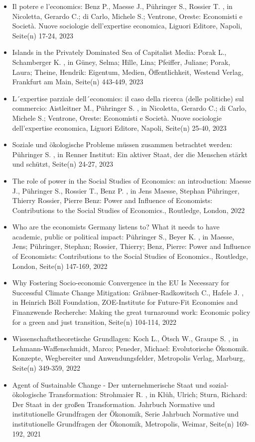 \begin{itemize}
\item Il potere e l'economics: Benz P., Maesse J., Pühringer S., Rossier T. , in Nicoletta, Gerardo C.; di Carlo, Michele S.; Ventrone, Oreste: Economisti e Società. Nuove sociologie dell'expertise economica, Liguori Editore, Napoli, Seite(n) 17-24, 2023
\item Islands in the Privately Dominated Sea of Capitalist Media: Porak L., Schamberger K. , in Güney, Selma; Hille, Lina; Pfeiffer, Juliane; Porak, Laura; Theine, Hendrik: Eigentum, Medien, Öffentlichkeit, Westend Verlag, Frankfurt am Main, Seite(n) 443-449, 2023
\item L´expertise parziale dell´economics: il caso della ricerca (delle politiche) sul commercio: Aistleitner M., Pühringer S. , in Nicoletta, Gerardo C.; di Carlo, Michele S.; Ventrone, Oreste: Economisti e Società. Nuove sociologie dell'expertise economica, Liguori Editore, Napoli, Seite(n) 25-40, 2023
\item Soziale und ökologische Probleme müssen zusammen betrachtet werden: Pühringer S. , in Renner Institut: Ein aktiver Staat, der die Menschen stärkt und schützt, Seite(n) 24-27, 2023
\item The role of power in the Social Studies of Economics: an introduction: Maesse J., Pühringer S., Rossier T., Benz P. , in Jens Maesse, Stephan Pühringer, Thierry Rossier,  Pierre Benz: Power and Influence of Economists: Contributions to the Social Studies of Economics., Routledge, London, 2022
\item Who are the economists Germany listens to? What it needs to have academic, public or political impact: Pühringer S., Beyer K. , in Maesse, Jens; Pühringer, Stephan; Rossier, Thierry; Benz, Pierre: Power and Influence of Economists: Contributions to the Social Studies of Economics., Routledge, London, Seite(n) 147-169, 2022
\item Why Fostering Socio-economic Convergence in the EU Is Necessary for Successful Climate Change Mitigation: Gräbner-Radkowitsch C., Hafele J. , in Heinrich Böll Foundation, ZOE-Institute for Future-Fit Economies and Finanzwende Recherche: Making the great turnaround work: Economic policy for a green and just transition, Seite(n) 104-114, 2022
\item Wissenschaftstheoretische Grundlagen: Koch L., Ötsch W., Graupe S. , in Lehmann-Waffenschmidt, Marco; Peneder, Michael: Evolutorische Ökonomik. Konzepte, Wegbereiter und Anwendungsfelder, Metropolis Verlag, Marburg, Seite(n) 349-359, 2022
\item Agent of Sustainable Change - Der unternehmerische Staat und sozial-ökologische Transformation: Strohmaier R. , in Klüh, Ulrich; Sturn, Richard: Der Staat in der großen Transformation. Jahrbuch Normative und institutionelle Grundfragen der Ökonomik, Serie Jahrbuch Normative und institutionelle Grundfragen der Ökonomik, Metropolis, Weimar, Seite(n) 169-192, 2021

\end{itemize}
